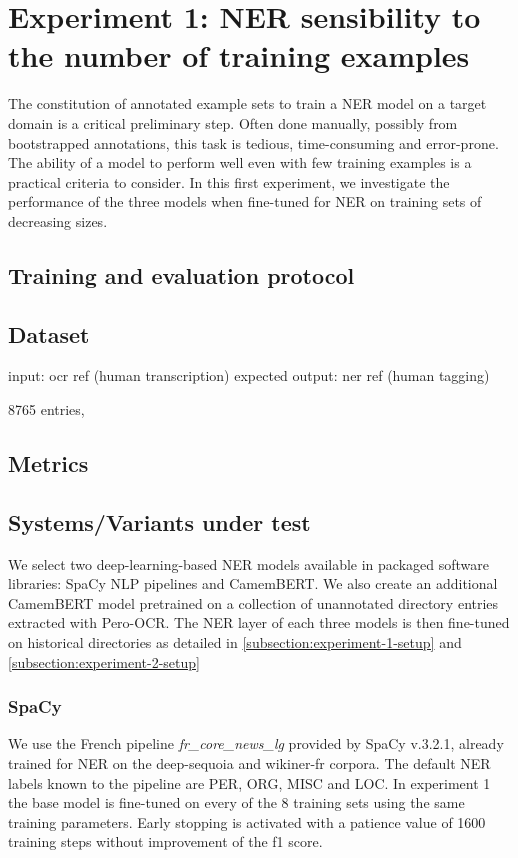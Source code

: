 \section{Experiment 1: NER sensibility to the number of training examples}
\label{sec:ner-xp1}

The constitution of annotated example sets to train a NER model on a target domain is a critical preliminary step.
Often done manually, possibly from bootstrapped annotations, this task is tedious, time-consuming and error-prone.
The ability of a model to perform well even with few training examples is a practical criteria to consider.
In this first experiment, we investigate the performance of the three models when fine-tuned for NER on training sets of decreasing sizes.

\subsection{Training and evaluation protocol}





\subsection{Dataset}
input: ocr ref (human transcription)
expected output: ner ref (human tagging)

8765 entries, 

\subsection{Metrics}



\subsection{Systems/Variants under test}
We select two deep-learning-based NER models available in packaged software libraries: SpaCy NLP pipelines and CamemBERT.
We also create an additional CamemBERT model pretrained on a collection of unannotated directory entries extracted with Pero-OCR.
The NER layer of each three models is then fine-tuned on historical directories as detailed in \cref{subsection:experiment-1-setup} and \cref{subsection:experiment-2-setup}

\subsubsection{SpaCy}
We use the French pipeline \textit{fr\_core\_news\_lg} provided by SpaCy v.3.2.1, already trained for NER on the deep-sequoia and wikiner-fr corpora.
The default NER labels known to the pipeline are PER, ORG, MISC and LOC.
In experiment 1 the base model is fine-tuned on every of the 8 training sets using the same training parameters.
Early stopping is activated with a patience value of 1600 training steps without improvement of the f1 score.

